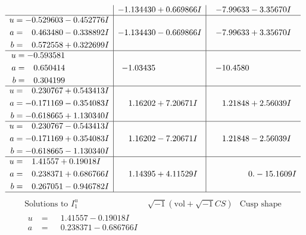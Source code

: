 \documentclass[1p]{elsarticle_modified}
\theoremstyle{definition}
\newcommand{\I}{\sqrt{-1}}
\begin{document}
$$\begin{array}{c|c|c}
 & -1.134430 + 0.669866 I & -7.99633 - 3.35670 I \\ \hline\begin{aligned}
u &= -0.529603 - 0.452776 I \\
a &= \phantom{-}0.463480 - 0.338892 I \\
b &= \phantom{-}0.572558 + 0.322699 I\end{aligned}
 & -1.134430 - 0.669866 I & -7.99633 + 3.35670 I \\ \hline\begin{aligned}
u &= -0.593581\phantom{ +0.000000I} \\
a &= \phantom{-}0.650414\phantom{ +0.000000I} \\
b &= \phantom{-}0.304199\phantom{ +0.000000I}\end{aligned}
 & -1.03435\phantom{ +0.000000I} & -10.4580\phantom{ +0.000000I} \\ \hline\begin{aligned}
u &= \phantom{-}0.230767 + 0.543413 I \\
a &= -0.171169 - 0.354083 I \\
b &= -0.618665 + 1.130340 I\end{aligned}
 & \phantom{-}1.16202 + 7.20671 I & \phantom{-}1.21848 + 2.56039 I \\ \hline\begin{aligned}
u &= \phantom{-}0.230767 - 0.543413 I \\
a &= -0.171169 + 0.354083 I \\
b &= -0.618665 - 1.130340 I\end{aligned}
 & \phantom{-}1.16202 - 7.20671 I & \phantom{-}1.21848 - 2.56039 I \\ \hline\begin{aligned}
u &= \phantom{-}1.41557 + 0.19018 I \\
a &= \phantom{-}0.238371 + 0.686766 I \\
b &= \phantom{-}0.267051 - 0.946782 I\end{aligned}
 & \phantom{-}1.14395 + 4.11529 I & \phantom{-0.000000 } 0. - 15.1609 I\\
 \hline 
 \end{array}$$\newpage$$\begin{array}{c|c|c}  
\text{Solutions to }I^u_{1}& \I (\text{vol} + \sqrt{-1}CS) & \text{Cusp shape}\\
 \hline 
\begin{aligned}
u &= \phantom{-}1.41557 - 0.19018 I \\
a &= \phantom{-}0.238371 - 0.686766 I \\

\end{aligned}
\end{array}$$
\end{document}
